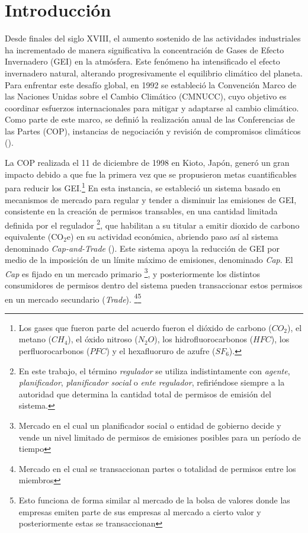 
\chapter{Introducción}
\label{c1} %

Desde finales del siglo XVIII, el aumento sostenido de las actividades industriales ha incrementado de manera significativa la concentración de Gases de Efecto Invernadero (GEI) en la atmósfera. Este fenómeno ha intensificado el efecto invernadero natural, alterando progresivamente el equilibrio climático del planeta. Para enfrentar este desafío global, en 1992 se estableció la Convención Marco de las Naciones Unidas sobre el Cambio Climático (CMNUCC), cuyo objetivo es coordinar esfuerzos internacionales para mitigar y adaptarse al cambio climático. Como parte de este marco, se definió la realización anual de las Conferencias de las Partes (COP), instancias de negociación y revisión de compromisos climáticos ().\medskip


La COP realizada el 11 de diciembre de 1998 en Kioto, Japón, generó un gran impacto debido a que fue la primera vez que se propusieron metas cuantificables para reducir los GEI.\footnote{Los gases que fueron parte del acuerdo fueron el dióxido de carbono ($CO_2$), el metano ($CH_4$), el óxido nitroso ($N_2O$), los hidrofluorocarbonos ($HFC$), los perfluorocarbonos ($PFC$) y el hexafluoruro de azufre ($SF_6$).} En esta instancia, se estableció un sistema basado en mecanismos de mercado para regular y tender a disminuir las emisiones de GEI, consistente en la creación de permisos transables, en una cantidad limitada definida por el regulador \footnote{En este trabajo, el término \emph{regulador} se utiliza indistintamente con \emph{agente}, \emph{planificador}, \emph{planificador social} o \emph{ente regulador}, refiriéndose siempre a la autoridad que determina la cantidad total de permisos de emisión del sistema.}, que habilitan a su titular a emitir dioxido de carbono equivalente (CO$_2$e) en su actividad económica, abriendo paso así al sistema denominado \emph{Cap-and-Trade} (). Este sistema apoya la reducción de GEI por medio de la imposición de un límite máximo de emisiones, denominado \textit{Cap}. El \textit{Cap} es fijado en un mercado primario \footnote{Mercado en el cual un planificador social o entidad de gobierno decide y vende un nivel limitado de permisos de emisiones posibles para un período de tiempo}, y posteriormente los distintos consumidores de permisos dentro del sistema pueden transaccionar estos permisos en un mercado secundario (\textit{Trade}). \footnote{Mercado en el cual se transaccionan partes o totalidad de permisos entre los miembros}\footnote{Esto funciona de forma similar al mercado de la bolsa de valores donde las empresas emiten parte de sus empresas al mercado a cierto valor y posteriormente estas se transaccionan}\medskip


